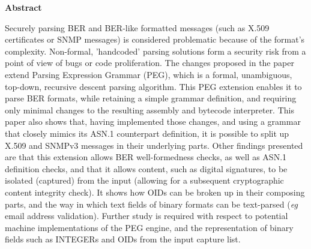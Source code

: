 \textbf{Abstract}

Securely parsing BER and BER-like formatted messages
(such as X.509 certificates or
SNMP messages) is considered problematic because of the format's complexity.
Non-formal, 'handcoded' parsing solutions form a security risk from a
point of view of bugs or code proliferation. The changes proposed in the
paper extend Parsing Expression Grammar
(PEG), which is a formal, unambiguous, top-down, recursive descent
parsing algorithm.
This PEG extension enables it to parse BER formats, while retaining a
simple grammar definition, and requiring only minimal changes to the
resulting assembly and bytecode interpreter. This paper also shows that,
having implemented those changes, and using a grammar that closely mimics
its ASN.1 counterpart definition, it is possible to split up X.509 and SNMPv3
messages in their underlying parts. Other findings presented
are that this extension allows BER well-formedness checks, as well as ASN.1
definition checks, and that it allows content, such as digital
signatures, to be isolated (captured) from the input (allowing for a subsequent
cryptographic content integrity check). It shows how OIDs
can be broken up in their composing parts, and the way in which text
fields of binary formats can be text-parsed (\textit{eg} email address
validation). Further study is required with respect to potential machine
implementations of the PEG engine, and the representation of binary
fields such as INTEGERs and OIDs from the input capture list.
